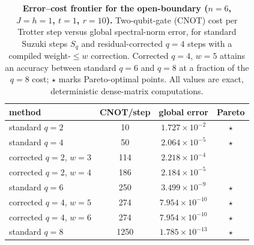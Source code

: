 \begin{table}[t]
\caption{\textbf{Error--cost frontier for the open-boundary \tfim{} ($n=6$, $J=h=1$, $t=1$, $r=10$).} Two-qubit-gate (CNOT) cost per Trotter step versus global spectral-norm error, for standard Suzuki steps $S_q$ and residual-corrected $q=4$ steps with a compiled weight-$\le w$ correction. Corrected $q=4$, $w=5$ attains an accuracy between standard $q=6$ and $q=8$ at a fraction of the $q=8$ cost; $\star$ marks Pareto-optimal points. All values are exact, deterministic dense-matrix computations.}
\label{tab:frontier}
\centering
\begin{tabular}{lccc}
\toprule
method & CNOT/step & global error & Pareto\\
\midrule
standard $q=2$ & 10 & $1.727\times10^{-2}$ & $\star$\\
standard $q=4$ & 50 & $2.064\times10^{-5}$ & $\star$\\
corrected $q=2$, $w=3$ & 114 & $2.218\times10^{-4}$ & \\
corrected $q=2$, $w=4$ & 186 & $2.184\times10^{-5}$ & \\
standard $q=6$ & 250 & $3.499\times10^{-9}$ & $\star$\\
corrected $q=4$, $w=5$ & 274 & $7.954\times10^{-10}$ & $\star$\\
corrected $q=4$, $w=6$ & 274 & $7.954\times10^{-10}$ & $\star$\\
standard $q=8$ & 1250 & $1.785\times10^{-13}$ & $\star$\\
\bottomrule
\end{tabular}
\end{table}
